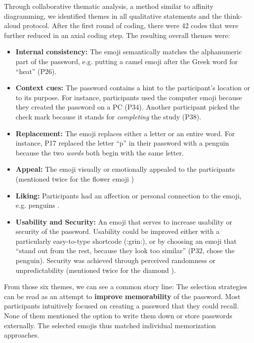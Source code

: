 Through collaborative thematic analysis, a method similar to affinity diagramming, we identified themes in all qualitative statements and the think-aloud protocol. After the first round of coding, there were 42 codes that were further reduced in an axial coding step. The resulting overall themes were:
\begin{itemize}[leftmargin=*]
	\item \textbf{Internal consistency:} The emoji semantically matches the alphanumeric part of the password, e.g. putting a camel emoji  after the Greek word for ``heat'' (P26). 
	\item \textbf{Context cues:} The password contains a hint to the participant's location or to its purpose. For instance, participants used the computer emoji  because they created the password on a PC (P34). Another participant picked the check mark  because it stands for \textit{completing} the study (P38). 
	\item \textbf{Replacement:} The emoji replaces either a letter or an entire word. For instance, P17 replaced the letter ``p'' in their password with a penguin  because the two \textit{words} both begin with the same letter.
	\item \textbf{Appeal:} The emoji visually or emotionally appealed to the participants (mentioned twice for the flower emoji )
	\item \textbf{Liking:} Participants had an affection or personal connection to the emoji, e.g. penguins .
	\item \textbf{Usability and Security:} An emoji that serves to increase usability or security of the password. Usability could be improved either with a particularly easy-to-type shortcode (:grin:), or by choosing an emoji that ``stand out from the rest, because they look too similar'' (P32, chose the penguin). Security was achieved through perceived randomness or unpredictability (mentioned twice for the diamond ).
\end{itemize}

From those six themes, we can see a common story line: The selection strategies can be read as an attempt to \textbf{improve memorability} of the password. Most participants intuitively focused on creating a password that they could recall. None of them mentioned the option to write them down or store passwords externally. The selected emojis thus matched individual memorization approaches.

